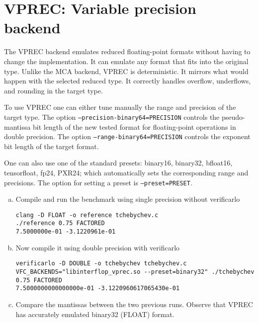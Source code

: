 \section{VPREC: Variable precision backend}

The VPREC backend emulates reduced floating-point formats without having to
change the implementation. It can emulate any format that fits into the original
type. Unlike the MCA backend, VPREC is deterministic. It mirrors what would happen
with the selected reduced type. It correctly handles overflow, underflows, and
rounding in the target type.

To use VPREC one can either tune manually the range and precision of the target
type. The option {\tt --precision-binary64=PRECISION} controls the
pseudo-mantissa bit length of the new tested format for floating-point
operations in double precision. The option {\tt --range-binary64=PRECISION}
controls the exponent bit length of the target format.

One can also use one of the standard presets: binary16, binary32, bfloat16,
tensorfloat, fp24, PXR24; which automatically sets the corresponding range and
precisions. The option for setting a preset is {\tt --preset=PRESET}.


\begin{question}
    \begin{enumerate}[(a)]
        \item Compile and run the benchmark using single precision without verificarlo
              \begin{verbatim}
clang -D FLOAT -o reference tchebychev.c
./reference 0.75 FACTORED
7.5000000e-01 -3.1220961e-01
\end{verbatim}
        \item Now compile it using double precision with verificarlo
              \begin{verbatim}
verificarlo -D DOUBLE -o tchebychev tchebychev.c
VFC_BACKENDS="libinterflop_vprec.so --preset=binary32" ./tchebychev 0.75 FACTORED 
7.5000000000000000e-01 -3.1220960617065430e-01
\end{verbatim}
        \item Compare the mantissas between the two previous runs. Observe that VPREC has accurately emulated binary32 (FLOAT) format.
    \end{enumerate}
\end{question}

